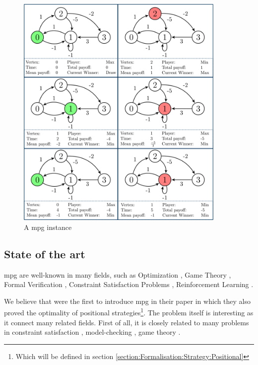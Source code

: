 \begin{figure}[hp]
	\centering
	\includegraphics[width=0.9\textwidth]{Figures/MeanPayoffGameExecution.png}
	\caption{A \acrshort{mpg} instance}
\end{figure}

\subsection{State of the art}
\acrfull{mpg} are well-known in many fields, such as Optimization \cite{SimplexMPG}, Game Theory \cite{PositionalStrategies}, Formal Verification \cite{OmegaSpecsMPG}, Constraint Satisfaction Problems  \cite{TropicalCSP,MPGMaxAtom}, Reinforcement Learning \cite{StrategyImprovement}.

We believe that \citeauthor{PositionalStrategies} were the first to introduce \acrshort{mpg} in their  paper \cite{PositionalStrategies} in which they also proved the optimality of positional strategies\footnote{Which will be defined in section \ref{section:Formalisation:Strategy:Positional}}. The problem itself is interesting as it connect many related fields. First of all, it is closely related to many problems in constraint satisfaction \cite{TropicalCSP,MPGMaxAtom}, model-checking \cite{OmegaSpecsMPG}, game theory \cite{PositionalStrategies}.

